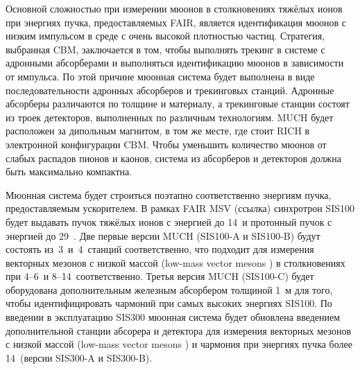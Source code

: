 Основной сложностью при измерении мюонов в столкновениях тяжёлых ионов при энергиях пучка, предоставляемых FAIR, является идентификация мюонов с низким импульсом в среде с очень высокой плотностью частиц. Стратегия, выбранная CBM, заключается в том, чтобы выполнять трекинг в системе с адронными абсорберами и выполняться идентификацию мюонов в зависимости от импульса. По этой причине мюонная система будет выполнена в виде последовательности адронных абсорберов и трекинговых станций. Адронные абсорберы различаются по толщине и материалу, а трекинговые станции состоят из троек детекторов, выполненных по различным технологиям. MUCH будет расположен за дипольным магнитом, в том же месте, где стоит RICH в электронной конфигурации CBM. Чтобы уменьшить количество мюонов от слабых распадов пионов и каонов, система из абсорберов и детекторов должна быть максимально компактна.


Мюонная система будет строиться поэтапно соответственно энергиям пучка, предоставляемым ускорителем. В рамках FAIR MSV (\todo ссылка) синхротрон SIS100 будет выдавать пучок тяжёлых ионов с энергией до 14~\GeVperNucl и протонный пучок с энергией до 29~\GeVperNucl. Две первые версии MUCH (SIS100-A и SIS100-B) будут состоять из~3~и~4~станций соответственно, что подходит для измерения векторных мезонов с низкой массой (low-mass vector mesons \todo) в столкновениях при 4--6~\GeVperNucl и 8--14~\GeVperNucl соответственно. Третья версия MUCH (SIS100-C) будет оборудована дополнительным железным абсорбером толщиной 1~м для того, чтобы идентифицировать чармоний при самых высоких энергиях SIS100. 
По введении в эксплуатацию SIS300 мюонная система будет обновлена введением дополнительной станции абсорера и детектора для измерения векторных мезонов с низкой массой (low-mass vector mesons \todo) и чармония при энергиях пучка более 14~\GeVperNucl (версии SIS300-A и SIS300-B).

